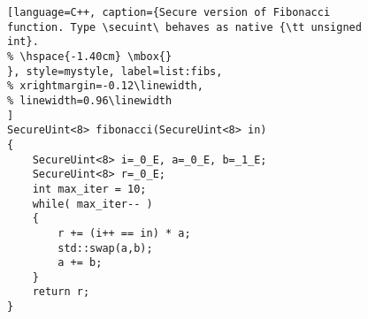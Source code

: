 \begin{figure}
\begin{minipage}{\linewidth}
\begin{lstlisting}[language=C++, caption={Secure version of Fibonacci function. Type \secuint\ behaves as native {\tt unsigned int}.
% \hspace{-1.40cm} \mbox{}
}, style=mystyle, label=list:fibs,
% xrightmargin=-0.12\linewidth,
% linewidth=0.96\linewidth
]
SecureUint<8> fibonacci(SecureUint<8> in)
{
    SecureUint<8> i=_0_E, a=_0_E, b=_1_E;
    SecureUint<8> r=_0_E;
    int max_iter = 10;
    while( max_iter-- )
    {
        r += (i++ == in) * a;
        std::swap(a,b);
        a += b;
    }
    return r;
}
\end{lstlisting}

\vspace{-0.5cm} 


\end{minipage}
\end{figure}
